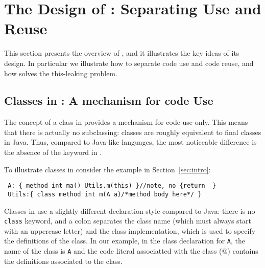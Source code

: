 
\section{The Design of \name: Separating Use and Reuse}

This section presents the overview of \name, and it illustrates the
key ideas of its design. In particular we illustrate how to separate code use and 
code reuse, and how \name solves the this-leaking problem.


\subsection{Classes in \name: A mechanism for code Use}
The concept of a class in \name provides a mechanism for code-use
only. This means that there is actually no subclassing:
classes are roughly equivalent to final classes in Java.  Thus,
compared to Java-like languages, the most noticeable difference is the
absence of the \Q@extends@ keyword in \name. 

To illustrate classes in \name consider the example in Section~\ref{sec:intro}:

\begin{lstlisting}
 A: { method int ma() Utils.m(this) }//note, no {return _}
 Utils:{ class method int m(A a)/*method body here*/ }
\end{lstlisting} 

\noindent Classes in \name use a slightly different declaration style compared
to Java: there is no \lstinline{class} keyword, and a colon separates the class name (which must always start with
an uppercase letter) and the class implementation, which is used to specify the
definitions of the class. In our example, in the class declaration
for \lstinline{A}, the name of the class is \lstinline{A} and the code 
literal associatted with the class (@) contains the definitions associated to the
class.


